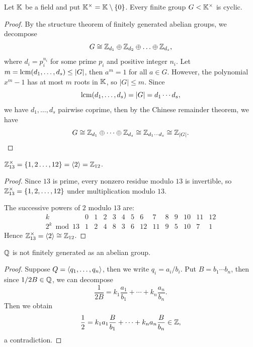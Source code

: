 \begin{corollary}
  Let \(\mathbb{K}\) be a field and put \(\mathbb{K}^\times = \mathbb{K}\setminus\{0\}\).
  Every finite group \(G < \mathbb{K}^\times\) is cyclic.
\end{corollary}
\begin{proof}
  By the structure theorem of finitely generated abelian groups, we decompose \[
    G \cong \mathbb{Z}_{d_1} \oplus \mathbb{Z}_{d_2} \oplus \ldots \oplus \mathbb{Z}_{d_s},
  \] where \(d_i = p_i^{n_i}\) for some prime \(p_i\) and positive integer \(n_i\).
  Let \(m = \operatorname{lcm}(d_1,\ldots,d_s) \leq |G|\), then \(a^m = 1\) for all \(a \in G\).
  However, the polynomial \(x^m - 1\) has at most \(m\) roots in \(\mathbb{K}\), so \(|G|\leq m\).
  Since \[
    \operatorname{lcm}(d_1,\ldots,d_s) = |G| =  d_1\cdots d_s,
  \] we have \(d_1,\ldots,d_s\) pairwise coprime, then by the Chinese remainder theorem, we have \[
    G \cong \mathbb{Z}_{d_1}\oplus\cdots\oplus\mathbb{Z}_{d_s} \cong \mathbb{Z}_{d_1\cdots d_s} \cong \mathbb{Z}_{|G|}.
  \]
\end{proof}

\begin{example}
  \(\mathbb{Z}_{13}^\times = \{1,2\ldots,12\} = \langle2\rangle = \mathbb{Z}_{12}\).
\end{example}
\begin{proof}
  Since \(13\) is prime, every nonzero residue modulo \(13\) is invertible, so \(\mathbb{Z}_{13}^\times = \{1,2,\ldots,12\}\) under multiplication modulo \(13\).

  The successive powers of \(2\) modulo \(13\) are:
  \[
    \begin{array}{c|ccccccccccccc}
    k&0&1&2&3&4&5&6&7&8&9&10&11&12\\
    \hline
    2^k\bmod 13&1&2&4&8&3&6&12&11&9&5&10&7&1
    \end{array}
  \]
  Hence \(\mathbb{Z}_{13}^\times = \langle2\rangle \cong \mathbb{Z}_{12}\).
\end{proof}

\begin{example}
  \(\mathbb{Q}\) is not finitely generated as an abelian group.
\end{example}
\begin{proof}
  Suppose \(Q = \langle q_1,\ldots,q_n\rangle\), then we write \(q_i = a_i/b_i\). Put \(B = b_1\cdots b_n\), then since \(1/2B\in\mathbb{Q}\), we can decompose \[
    \frac{1}{2B} = k_1\frac{a_1}{b_1} + \cdots + k_n\frac{a_n}{b_n}.
  \]
  Then we obtain \[
    \frac{1}{2} = k_1a_1\frac{B}{b_1} + \cdots + k_na_n\frac{B}{b_n} \in \mathbb{Z},
  \] a contradiction.
\end{proof}

